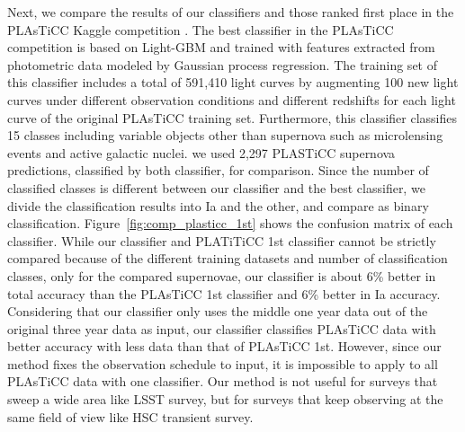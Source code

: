 \documentclass[useamsfonts]{pasj01}
\begin{document}
Next, we compare the results of our classifiers and those ranked first place in the PLAsTiCC Kaggle competition \citep{malz19a}.
The best classifier in the PLAsTiCC competition \citep{Boone_2019} is based on Light-GBM and trained with features extracted from photometric data modeled by Gaussian process regression.
The training set of this classifier includes a total of 591,410 light curves by augmenting 100 new light curves under different observation conditions and different redshifts for each light curve of the original PLAsTiCC training set.
Furthermore, this classifier classifies 15 classes including variable objects other than supernova such as microlensing events and active galactic nuclei.
we used 2,297 PLASTiCC supernova predictions, classified by both classifier, for comparison.
Since the number of classified classes is different between our classifier and the best classifier, we divide the classification results into Ia and the other, and compare as binary classification.
Figure\ \ref{fig:comp_plasticc_1st} shows the confusion matrix of each classifier.
While our classifier and PLATiTiCC 1st classifier cannot be strictly compared because of the different training datasets and number of classification classes,
only for the compared supernovae, our classifier is about 6\% better in total accuracy than the PLAsTiCC 1st classifier and 6\% better in Ia accuracy.
Considering that our classifier only uses the middle one year data out of the original three year data as input, our classifier classifies PLAsTiCC data with better accuracy with less data than that of PLAsTiCC 1st.
However, since our method fixes the observation schedule to input, it is impossible to apply to all PLAsTiCC data with one classifier.
Our method is not useful for surveys that sweep a wide area like LSST survey, but for surveys that keep observing at the same field of view like HSC transient survey.
%
\end{document}
